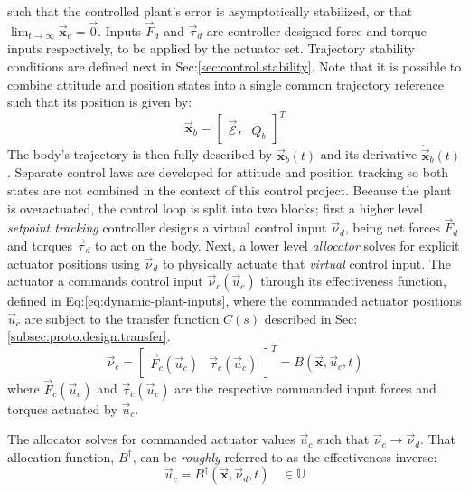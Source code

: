 such that the controlled plant's error is asymptotically stabilized, or that $\lim_{t\rightarrow\infty}\vec{\mathbf{x}}_e=\vec{0}$. Inputs $\vec{F}_d$ and $\vec{\tau}_d$ are controller designed force and torque inputs respectively, to be applied by the actuator set. Trajectory stability conditions are defined next in Sec:\ref{sec:control.stability}. Note that it is possible to combine attitude and position states into a single common trajectory reference such that its position is given by:
\\
\vspace{-5pt}
\begin{equation}
\vec{\mathbf{x}}_b=\begin{bmatrix}\vec{\mathcal{E}}_I&Q_b\end{bmatrix}^T
\end{equation}
The body's trajectory is then fully described by $\vec{\mathbf{x}}_b(t)$ and its derivative $\dot{\vec{\mathbf{x}}}_b(t)$. Separate control laws are developed for attitude and position tracking so both states are not combined in the context of this control project. Because the plant is overactuated, the control loop is split into two blocks; first a higher level \emph{setpoint tracking} controller designs a virtual control input $\vec{\nu}_d$, being net forces $\vec{F}_d$ and torques $\vec{\tau}_d$ to act on the body. Next, a lower level \emph{allocator} solves for explicit actuator positions using $\vec{\nu}_d$ to physically actuate that \emph{virtual} control input. The actuator a commands control input $\vec{\nu}_c(\vec{u}_c)$ through its effectiveness function, defined in Eq:\ref{eq:dynamic-plant-inputs}, where the commanded actuator positions $\vec{u}_c$ are subject to the transfer function $C(s)$ described in Sec:\ref{subsec:proto.design.transfer}.
\begin{equation}\label{eq:control-effectiveness}
\vec{\nu}_c=\begin{bmatrix}
\vec{F}_c(\vec{u}_c) & \vec{\tau}_c(\vec{u}_c)
\end{bmatrix}^T=B(\vec{\mathbf{x}},\vec{u}_c,t)
\end{equation}
where $\vec{F}_c(\vec{u}_c)$ and $\vec{\tau}_c(\vec{u}_c)$ are the respective commanded input forces and torques actuated by $\vec{u}_c$. 
\par
The allocator solves for commanded actuator values $\vec{u}_c$ such that $\vec{\nu}_c\rightarrow\vec{\nu}_d$. That allocation function, $B^\dagger$, can be \emph{roughly} referred to as the effectiveness inverse:
\begin{equation}
\vec{u}_c=B^{\dagger}(\vec{\mathbf{x}},\vec{\nu}_d,t)~~~~\in\mathbb{U}
\end{equation}
